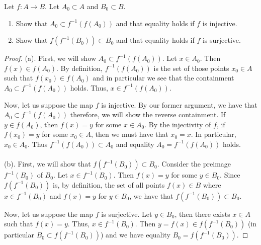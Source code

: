 \begin{problem}[Munkres \S2, 1(a,b).]
Let $f\colon A\to B$. Let $A_0\subset A$ and $B_0\subset B$.
\begin{enumerate}[noitemsep,label=(\alph*)]
\item Show that $A_0\subset f^{-1}(f(A_0))$ and that equality
  holds if $f$ is injective.
\item Show that $f(f^{-1}(B_0))\subset B_0$ and that equality
  holds if $f$ is surjective.
\end{enumerate}
\end{problem}
\begin{proof}
(a). First, we will show $A_0\subset f^{-1}(f(A_0))$. Let $x\in
A_0$. Then $f(x)\in f(A_0)$. By definition, $f^{-1}(f(A_0))$ is
the set of those points $x_0\in A$ such that $f(x_0)\in f(A_0)$
and in particular we see that the containment $A_0\subset
f^{-1}(f(A_0))$ holds. Thus, $x\in f^{-1}(f(A_0))$.

Now, let us suppose the map $f$ is injective. By our former
argument, we have that $A_0\subset f^{-1}(f(A_0))$ therefore, we
will show the reverse containment. If $y\in f(A_0)$, then
$f(x)=y$ for some $x\in A_0$. By the injectivity of $f$, if
$f(x_0)=y$ for some $x_0\in A$, then we must have that
$x_0=x$. In particular, $x_0\in A_0$. Thus $f^{-1}(f(A_0))\subset
A_0$ and equality $A_0=f^{-1}(f(A_0))$ holds.
\\\\
(b). First, we will show that $f(f^{-1}(B_0))\subset
B_0$. Consider the preimage $f^{-1}(B_0)$ of $B_0$. Let $x\in
f^{-1}(B_0)$. Then $f(x)=y$ for some $y\in B_0$. Since
$f(f^{-1}(B_0))$ is, by definition, the set of all points
$f(x)\in B$ where $x\in f^{-1}(B_0)$ and $f(x)=y$ for $y\in B_0$,
we have that $f(f^{-1}(B_0))\subset B_0$.

Now, let us suppose the map $f$ is surjective. Let $y\in B_0$,
then there exists $x\in A$ such that $f(x)=y$. Thus, $x\in
f^{-1}(B_0)$. Then $y=f(x)\in f(f^{-1}(B_0))$ (in particular
$B_0\subset f(f^{-1}(B_0))$) and we have equality
$B_0=f(f^{-1}(B_0))$.
\end{proof}
\newpage

